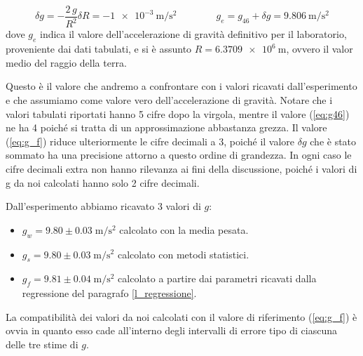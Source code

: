 \begin{equation}
    \delta g = - \frac{2\,g}{R^2} \delta R = \SI{-1e-3}{\meter\per\square\second}
    \qquad \qquad
    g_e = g_{46} + \delta g = \SI{9.806}{\meter\per\square\second}
    \label{eq:g_f}
\end{equation}
%
dove $g_e$ indica il valore dell'accelerazione di gravità definitivo per il laboratorio, proveniente dai dati tabulati,
e si è assunto $R = \SI{6.3709e6}{\metre}$, ovvero il valor medio del raggio della terra.

Questo è il valore che andremo a confrontare con i valori ricavati dall'esperimento e che assumiamo come valore vero
dell'accelerazione di gravità. Notare che i valori tabulati riportati hanno 5 cifre dopo la virgola, mentre il valore (\ref{eq:g46})
ne ha 4 poiché si tratta di un approssimazione abbastanza grezza. Il valore (\ref{eq:g_f}) riduce ulteriormente le cifre decimali a 3,
poiché il valore $\delta g$ che è stato sommato ha una precisione attorno a questo ordine di grandezza. In ogni caso
le cifre decimali extra non hanno rilevanza ai fini della discussione, poiché i valori di g da noi calcolati hanno solo 2
cifre decimali. 

Dall'esperimento abbiamo ricavato 3 valori di $g$:

\begin{itemize}
    \item{$g_w = 9.80 \pm 0.03 \; \si{\metre\per\square\second}$ calcolato con la media pesata.}
    \item{$g_s = 9.80 \pm 0.03 \; \si{\metre\per\square\second}$ calcolato con metodi statistici.}
    \item{$g_f = 9.81 \pm 0.04 \; \si{\metre\per\square\second}$ calcolato a partire dai parametri ricavati dalla regressione
        del paragrafo \ref{l_regressione}.}
\end{itemize}

La compatibilità dei valori da noi calcolati con il valore di riferimento (\ref{eq:g_f}) è ovvia in quanto esso cade all'interno
degli intervalli di errore tipo di ciascuna delle tre stime di $g$.
